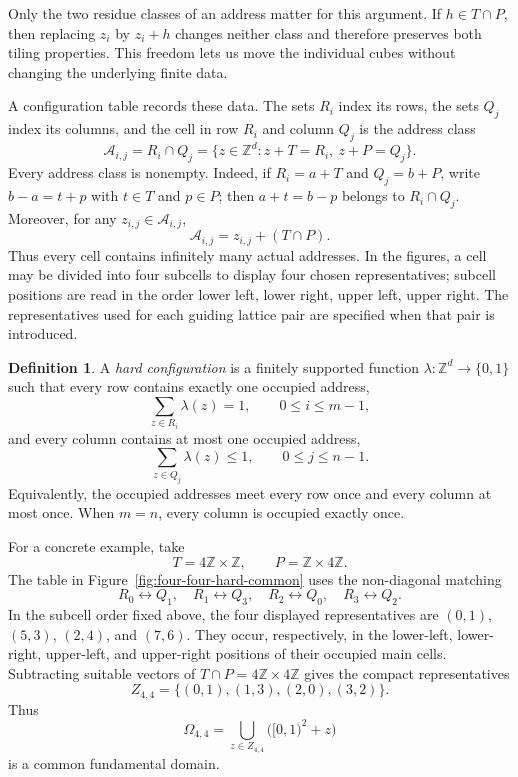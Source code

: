 \documentclass[11pt,reqno]{amsart}
\numberwithin{equation}{section}
\theoremstyle{definition}
\newtheorem{definition}[theorem]{Definition}
\theoremstyle{remark}
\newcommand{\Z}{\mathbb Z}
\begin{document}
Only the two residue classes of an address matter for this argument.  If
$h\in T\cap P$, then replacing $z_i$ by $z_i+h$ changes neither class and
therefore preserves both tiling properties.  This freedom lets us move the
individual cubes without changing the underlying finite data.

A configuration table records these data.  The sets $R_i$ index its rows,
the sets $Q_j$ index its columns, and the cell in row $R_i$ and column $Q_j$
is the address class
\begin{equation}\label{eq:group-address-class}
 \mathcal A_{i,j}=R_i\cap Q_j
 =\{z\in\Z^d:z+T=R_i,\ z+P=Q_j\}.
\end{equation}
Every address class is nonempty.  Indeed, if $R_i=a+T$ and $Q_j=b+P$, write
$b-a=t+p$ with $t\in T$ and $p\in P$; then $a+t=b-p$ belongs to
$R_i\cap Q_j$.  Moreover, for any $z_{i,j}\in\mathcal A_{i,j}$,
\begin{equation}\label{eq:address-class-coset}
 \mathcal A_{i,j}=z_{i,j}+(T\cap P).
\end{equation}
Thus every cell contains infinitely many actual addresses.  In the figures, a
cell may be divided into four subcells to display four chosen representatives;
subcell positions are read in the order lower left, lower right, upper left,
upper right.  The representatives used for each guiding lattice pair are
specified when that pair is introduced.

\begin{definition}\label{def:hard-configuration}
A \emph{hard configuration} is a finitely supported function
$\lambda:\Z^d\to\{0,1\}$ such that every row contains exactly one occupied
address,
\begin{equation}\label{eq:hard-row}
 \sum_{z\in R_i}\lambda(z)=1,
 \qquad 0\le i\le m-1,
\end{equation}
and every column contains at most one occupied address,
\begin{equation}\label{eq:hard-column}
 \sum_{z\in Q_j}\lambda(z)\le1,
 \qquad 0\le j\le n-1.
\end{equation}
Equivalently, the occupied addresses meet every row once and every column at
most once.  When $m=n$, every column is occupied exactly once.
\end{definition}

For a concrete example, take
\[
 T=4\Z\times\Z,
 \qquad
 P=\Z\times4\Z.
\]
The table in Figure~\ref{fig:four-four-hard-common} uses the non-diagonal
matching
\[
 R_0\leftrightarrow Q_1,
 \quad R_1\leftrightarrow Q_3,
 \quad R_2\leftrightarrow Q_0,
 \quad R_3\leftrightarrow Q_2.
\]
In the subcell order fixed above, the four displayed representatives are
$(0,1)$, $(5,3)$, $(2,4)$, and $(7,6)$.  They occur, respectively, in the lower-left,
lower-right, upper-left, and upper-right positions of their occupied main
cells.  Subtracting suitable vectors of $T\cap P=4\Z\times4\Z$ gives the
compact representatives
\begin{equation}\label{eq:four-four-addresses}
 Z_{4,4}=\{(0,1),(1,3),(2,0),(3,2)\}.
\end{equation}
Thus
\[
 \Omega_{4,4}=\bigcup_{z\in Z_{4,4}}\bigl([0,1)^2+z\bigr)
\]
is a common fundamental domain.
\end{document}
